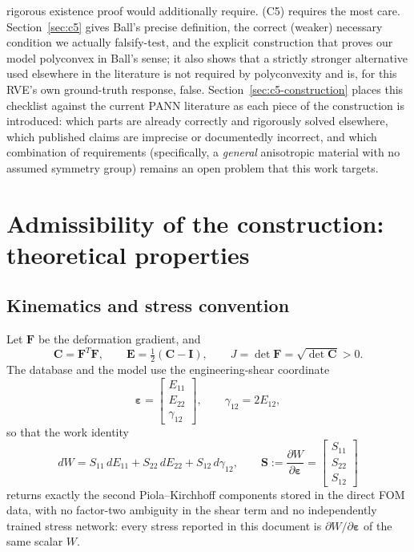 \documentclass[10pt,a4paper]{article}
\begin{document}
rigorous existence proof would additionally require.
(C5) requires the most care. Section~\ref{sec:c5} gives Ball's precise
definition, the correct (weaker) necessary condition we actually
falsify-test, and the explicit construction that proves our model
polyconvex in Ball's sense; it also shows that a strictly stronger
alternative used elsewhere in the literature is not required by
polyconvexity and is, for this RVE's own ground-truth response, false.
Section~\ref{sec:c5-construction} places this checklist against the
current PANN literature as each piece of the construction is introduced:
which parts are already correctly and rigorously solved elsewhere, which
published claims are imprecise or documentedly incorrect, and which
combination of requirements (specifically, a \emph{general} anisotropic
material with no assumed symmetry group) remains an open problem that
this work targets.

\section{Admissibility of the construction: theoretical properties}
\label{sec:theory}

\subsection{Kinematics and stress convention}
\label{sec:kinematics}
Let $\bm F$ be the deformation gradient, and
\begin{equation}
 \bm C=\bm F^T\bm F,\qquad \bm E=\tfrac12(\bm C-\bm I),\qquad J=\det \bm F=\sqrt{\det \bm C}>0.
 \label{eq:kinematics}
\end{equation}
The database and the model use the engineering-shear coordinate
\begin{equation}
 \bm\varepsilon=\begin{bmatrix}E_{11}\\E_{22}\\\gamma_{12}\end{bmatrix},
 \qquad \gamma_{12}=2E_{12},
 \label{eq:e-coordinate}
\end{equation}
so that the work identity
\begin{equation}
 dW=S_{11}\,dE_{11}+S_{22}\,dE_{22}+S_{12}\,d\gamma_{12},\qquad
 \bm S:=\frac{\partial W}{\partial\bm\varepsilon}
 =\begin{bmatrix}S_{11}\\S_{22}\\S_{12}\end{bmatrix}
 \label{eq:stress}
\end{equation}
returns exactly the second Piola--Kirchhoff components stored in the
direct FOM data, with no factor-two ambiguity in the shear term and no
independently trained stress network: every stress reported in this
document is $\partial W/\partial\bm\varepsilon$ of the same scalar $W$.
\end{document}
